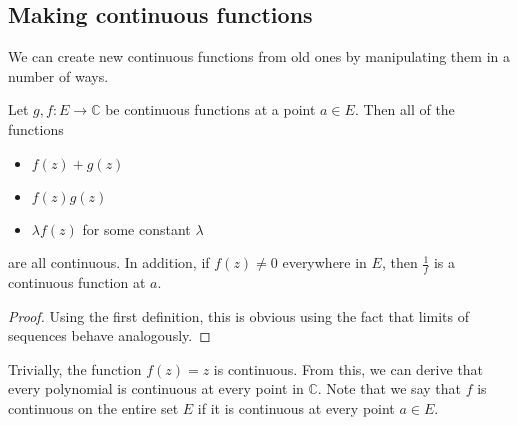 \subsection{Making continuous functions}
We can create new continuous functions from old ones by manipulating them in a number of ways.
\begin{proposition}
	Let \(g, f \colon E \to \mathbb C\) be continuous functions at a point \(a \in E\).
	Then all of the functions
	\begin{itemize}
		\item \(f(z) + g(z)\)
		\item \(f(z)g(z)\)
		\item \(\lambda f(z)\) for some constant \(\lambda\)
	\end{itemize}
	are all continuous.
	In addition, if \(f(z) \neq 0\) everywhere in \(E\), then \(\frac{1}{f}\) is a continuous function at \(a\).
\end{proposition}
\begin{proof}
	Using the first definition, this is obvious using the fact that limits of sequences behave analogously.
\end{proof}
Trivially, the function \(f(z) = z\) is continuous.
From this, we can derive that every polynomial is continuous at every point in \(\mathbb C\).
Note that we say that \(f\) is continuous on the entire set \(E\) if it is continuous at every point \(a \in E\).

